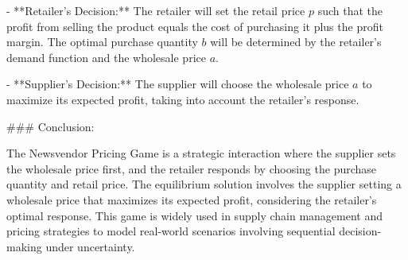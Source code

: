 - **Retailer's Decision:**
  The retailer will set the retail price \(p\) such that the profit from selling the product equals the cost of purchasing it plus the profit margin. The optimal purchase quantity \(b\) will be determined by the retailer's demand function and the wholesale price \(a\).

- **Supplier's Decision:**
  The supplier will choose the wholesale price \(a\) to maximize its expected profit, taking into account the retailer's response.

### Conclusion:

The Newsvendor Pricing Game is a strategic interaction where the supplier sets the wholesale price first, and the retailer responds by choosing the purchase quantity and retail price. The equilibrium solution involves the supplier setting a wholesale price that maximizes its expected profit, considering the retailer's optimal response. This game is widely used in supply chain management and pricing strategies to model real-world scenarios involving sequential decision-making under uncertainty.